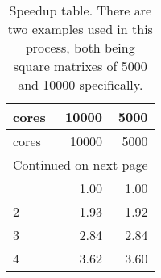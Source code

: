 \begin{longtable}{lrr}
	\caption[Speedup]{Speedup table. There are two examples used in this process, both being square matrixes of 5000 and 10000 specifically.}
	\label{tab:speedup}
	\\
	
\toprule
cores & 10000 & 5000 \\
\midrule
\endfirsthead
\toprule
 cores & 10000 & 5000 \\
\midrule
\endhead
\midrule
\multicolumn{3}{r}{Continued on next page} \\
\midrule
\endfoot
\bottomrule
\endlastfoot
1 & 1.00 & 1.00 \\
2 & 1.93 & 1.92 \\
3 & 2.84 & 2.84 \\
4 & 3.62 & 3.60 \\
\end{longtable}

